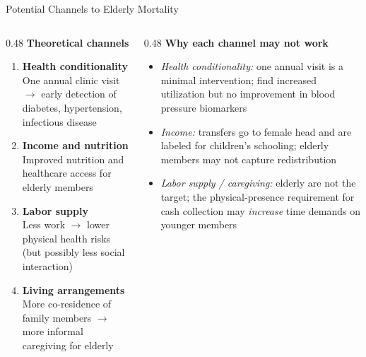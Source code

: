 \documentclass[aspectratio=169,usenames,dvipsnames]{beamer}
\newcommand{\smallcite}[1]{{\footnotesize\textcolor{Blue}{\citep{#1}}}}
\begin{document}
\begin{frame}{Potential Channels to Elderly Mortality}\label{channels}
\footnotesize
\begin{columns}[T]
  \begin{column}{0.48\textwidth}
    \textbf{Theoretical channels}
    \vspace{4pt}
    \begin{enumerate}
      \item \textbf{Health conditionality} \\
        One annual clinic visit $\to$ early detection of diabetes, hypertension, infectious disease
      \vspace{3pt}
      \item \textbf{Income and nutrition} \\
        Improved nutrition and healthcare access for elderly members
      \vspace{3pt}
      \item \textbf{Labor supply} \\
        Less work $\to$ lower physical health risks (but possibly less social interaction)
      \vspace{3pt}
      \item \textbf{Living arrangements} \\
        More co-residence of family members $\to$ more informal caregiving for elderly
    \end{enumerate}
  \end{column}
  \begin{column}{0.48\textwidth}
    \textbf{Why each channel may not work}
    \vspace{4pt}
    \begin{itemize}
      \item[$\circ$] \textit{Health conditionality:} one annual visit is a minimal intervention; \cite{aguila2024conditional} find increased utilization but no improvement in blood pressure biomarkers
      \vspace{4pt}
      \item[$\circ$] \textit{Income:} transfers go to female head and are labeled for children's schooling; elderly members may not capture redistribution
      \vspace{4pt}
      \item[$\circ$] \textit{Labor supply / caregiving:} elderly are not the target; the physical-presence requirement for cash collection may \textit{increase} time demands on younger members \smallcite{BehrmanParker2013Demography}
    \end{itemize}
  \end{column}
\end{columns}
\end{frame}
\end{document}
